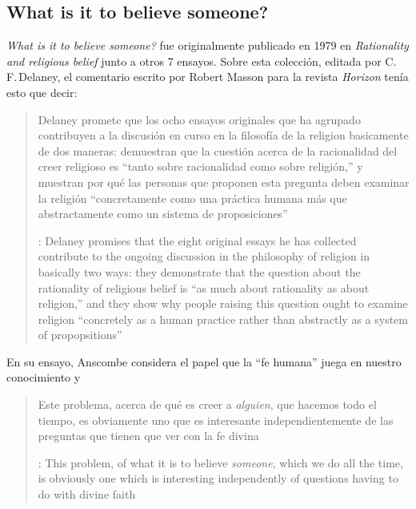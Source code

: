\subsection{What is it to believe someone?}

\emph{What is it to believe someone?} fue originalmente publicado en 1979 en \emph{Rationality and religious belief} junto a otros 7 ensayos. Sobre esta colección, editada por C.\,F.\,Delaney, el comentario escrito por Robert Masson para la revista \emph{Horizon} tenía esto que decir: \blockquote[{\cite[440]{masson1981}}: Delaney promises that the eight original essays he has collected \textelp{} contribute to the ongoing discussion in the philosophy of religion in basically two ways: they demonstrate that the question about the rationality of religious belief is ``as much about rationality as about religion,'' and they show why people raising this question ought to examine religion ``concretely as a human practice rather than abstractly as a system of propopsitions'']{Delaney promete que los ocho ensayos originales que ha agrupado \textelp{} contribuyen a la discusión en curso en la filosofía de la religion basicamente de dos maneras: demuestran que la cuestión acerca de la racionalidad del creer religioso es ``tanto sobre racionalidad como sobre religión,'' y muestran por qué las personas que proponen esta pregunta deben examinar la religión ``concretamente como una práctica humana más que abstractamente como un sistema de proposiciones''}. En su ensayo, Anscombe considera el papel que la \enquote{fe humana} juega en nuestro conocimiento y \blockquote[{\cite[xvii]{anscombe2008faith}}: This problem, of what it is to believe \emph{someone}, which we do all the time, is obviously one which is interesting independently of questions having to do with divine faith]{Este problema, acerca de qué es creer a \emph{alguien}, que hacemos todo el tiempo, es obviamente uno que es interesante independientemente de las preguntas que tienen que ver con la fe divina}.

